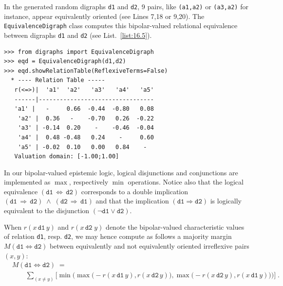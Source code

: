 In the generated random digraphs \texttt{d1} and \texttt{d2}, 9 pairs, like \texttt{(a1,a2)} or \texttt{(a3,a2)} for instance, appear equivalently oriented (see Lines 7,18 or 9,20). The \texttt{Equiva\-lenceDigraph} class computes this bipolar-valued relational equivalence between digraphs \texttt{d1} and \texttt{d2} (see List.~\vref{list:16.5}).
\begin{lstlisting}[caption={Bipolar-valued Equivalence Digraph},label=list:16.5]
>>> from digraphs import EquivalenceDigraph
>>> eqd = EquivalenceDigraph(d1,d2)
>>> eqd.showRelationTable(ReflexiveTerms=False)
  * ---- Relation Table -----
   r(<=>)|  'a1'  'a2'   'a3'   'a4'   'a5'	  
   ------|---------------------------------
   'a1' |   - 	  0.66  -0.44  -0.80   0.08	 
    'a2' |  0.36   -    -0.70   0.26  -0.22	 
    'a3' | -0.14  0.20    -    -0.46  -0.04	 
    'a4' |  0.48 -0.48   0.24    -     0.60	 
    'a5' | -0.02  0.10   0.00   0.84    - 	 
   Valuation domain: [-1.00;1.00]
\end{lstlisting}

In our bipolar-valued epistemic logic, logical disjunctions and conjunctions are implemented as $\max$, respectively $\min$ operations. Notice also that the logical equivalence $(\mathtt{d1}\, \Leftrightarrow\, \mathtt{d2})$ corresponds to a double implication $(\mathtt{d1}\, \Rightarrow\, \mathtt{d2})\; \wedge \; (\mathtt{d2}\, \Rightarrow\,  \mathtt{d1})$ and that the implication $(\mathtt{d1} \Rightarrow \mathtt{d2})$ is logically equivalent to the disjunction $(\neg \mathtt{d1} \vee \mathtt{d2})$.

When $r(x\,\mathtt{d1}\, y)$ and $r(x\,\mathtt{d2}\; y)$ denote the bipolar-valued characteristic values of relation \texttt{d1}, resp. \texttt{d2}, we may hence compute as follows a majority margin $M(\mathtt{d1} \Leftrightarrow \mathtt{d2})$ between equivalently and not equivalently oriented irreflexive pairs $(x,y)$:
\begin{equation}\label{eq:16:2}
  \begin{split}
&M(\mathtt{d1} \Leftrightarrow \mathtt{d2}) \; =\\
&\quad \quad \sum_{(x \neq y)} \Big[ \min \Big( \max \big( -r(x \,\mathtt{d1}\, y), r(x \,\mathtt{d2}\, y)\big), \max \big( -r(x \,\mathtt{d2}\, y), r(x \,\mathtt{d1}\, y)\big) \Big) \Big]\;.
\end{split}
\end{equation}


